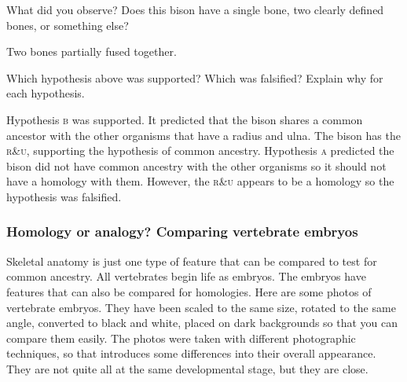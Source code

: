 \documentclass[12pt, hidelinks]{exam}
\newcommand*\AnswerBox[2]{%
    \parbox[t][#1]{0.92\textwidth}{%
    \begin{solution}#2\end{solution}}
    \vspace{\stretch{1}}
}
\begin{document}
\begin{questions}

\question
What did you observe? Does this bison have a single bone, two clearly defined bones, or something else?

\AnswerBox{5\baselineskip}{Two bones partially fused together.}

\question
Which hypothesis above was supported? Which was falsified? Explain why for each hypothesis.

\AnswerBox{4\baselineskip}{Hypothesis \textsc{b} was supported. It predicted that the bison shares a common ancestor with the other organisms that have a radius and ulna. The bison has the \textsc{r\&u}, supporting the hypothesis of common ancestry. Hypothesis \textsc{a} predicted the bison did not have common ancestry with the other organisms so it should not have a homology with them. However, the \textsc{r\&u} appears to be a homology so the hypothesis was falsified.}

\newpage

\subsubsection*{Homology or analogy? Comparing vertebrate embryos}

Skeletal anatomy is just one type of feature that can
be compared to test for common ancestry. All vertebrates
begin life as embryos. The embryos have features that can
also be compared for homologies.
Here are some photos of vertebrate embryos. They have been scaled to
the same size, rotated to the same angle, converted to 
black and white, placed on dark backgrounds so that you can compare 
them easily. The photos were taken with different
photographic techniques, so that introduces some differences into their
overall appearance. They are not quite all at the same developmental
stage, but they are close.


\end{questions}
\end{document}
